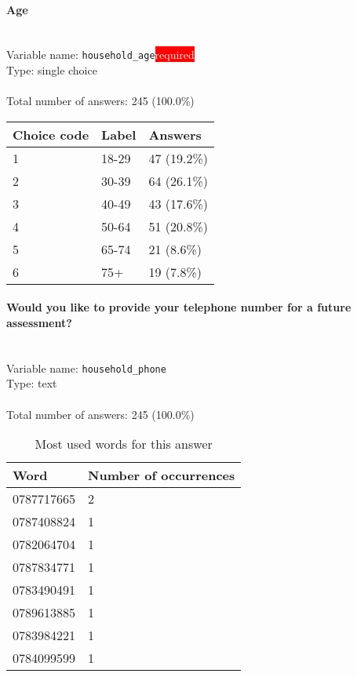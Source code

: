 \documentclass[11.5pt, a4paper]{scrartcl}
\begin{document}
\paragraph{Age }
\  \\Variable name: \texttt{household\_age}\hfill\colorbox{red}{\small{\textcolor{white}{required}}}\\
 Type: single choice\\
\\Total number of answers: 245 (100.0\%)
\\[0.2em] \begin{tabular}{p{4cm}|p{8cm}|p{3cm}}
Choice code & Label & Answers \\
\hline
1 & 18-29& \cellcolor{color0}47 (19.2\%)\\
\cellcolor{mygray} 2 & \cellcolor{mygray}30-39 & \cellcolor{color1}64 (26.1\%)\\
3 & 40-49& \cellcolor{color0}43 (17.6\%)\\
\cellcolor{mygray} 4 & \cellcolor{mygray}50-64 & \cellcolor{color1}51 (20.8\%)\\
5 & 65-74& \cellcolor{color0}21 (8.6\%)\\
\cellcolor{mygray} 6 & \cellcolor{mygray}75+ & \cellcolor{color0}19 (7.8\%)\\
\end{tabular}
\paragraph{Would you like to provide your telephone number for a future assessment?}
\  \\Variable name: \texttt{household\_phone}\\
Type: text\\
\\Total number of answers: 245 (100.0\%)
\\[0.2em]\begin{table}[H]
 \begin{tabular}{p{4cm}|p{8cm}}
Word & Number of occurrences  \\
\hline
\cellcolor{mygray}0787717665&\cellcolor{mygray}2\\
\hline
0787408824&1\\
\hline
\cellcolor{mygray}0782064704&\cellcolor{mygray}1\\
\hline
0787834771&1\\
\hline
\cellcolor{mygray}0783490491&\cellcolor{mygray}1\\
\hline
0789613885&1\\
\hline
\cellcolor{mygray}0783984221&\cellcolor{mygray}1\\
\hline
0784099599&1\\
\hline
\end{tabular}
\caption{\label{tab:table-name} Most used words for this answer}
\end{table}
\end{document}
